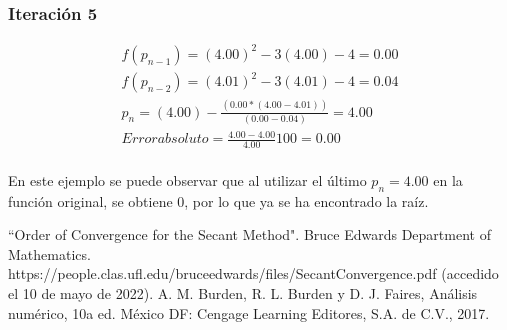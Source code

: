\documentclass[10pt,technote]{IEEEtran}
\begin{document}
\subsubsection{Iteración 5}
\begin{gather*}
    f(p_{n-1}) =(4.00)^{2}-3(4.00)-4 = 0.00 \\
    f(p_{n-2}) =(4.01)^{2}-3(4.01)-4 = 0.04 \\
    p_n = (4.00)- \frac{(0.00*(4.00-4.01))}{(0.00-0.04)} = 4.00 \\
    Error absoluto = \frac{4.00-4.00}{4.00}100 = 0.00
\end{gather*} \\

En este ejemplo se puede observar que al utilizar el último $p_n = 4.00$ en la función original, se obtiene $0$, por lo que ya se ha encontrado la raíz.

\begin{thebibliography}{00}
 ``Order of Convergence for the Secant Method". Bruce Edwards Department of Mathematics. https://people.clas.ufl.edu/bruceedwards/files/SecantConvergence.pdf (accedido el 10 de mayo de 2022).
 A. M. Burden, R. L. Burden y D. J. Faires, Análisis numérico, 10a ed. México DF: Cengage Learning Editores, S.A. de C.V., 2017.
\end{thebibliography}
\end{document}
